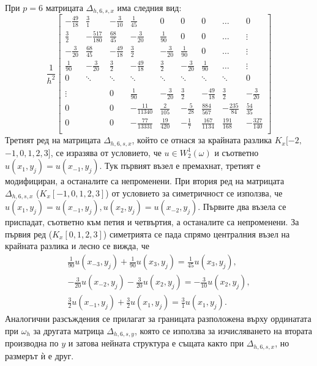 \documentclass[a4paper]{article}
\theoremstyle{remark}
\begin{document}
\begin{large}
При $p=6$ матрицата $\Delta_{h,6,s,x}$ има следния вид:
\[
\frac{1}{h^2}
\begin{bmatrix}
   -\frac{49}{18}		& \frac{3}{1}			&   -\frac{3}{10}		& \frac{1}{45}    		 &  0					& 0	   					&    0      	   	&   \dots           & 0    \\
    \frac{3}{2}    	&-\frac{517}{180}    	&    \frac{68}{45}     & -\frac{3}{20}  	 		& \frac{1}{90} 		&  0					 &   0      	   	&   \dots	       & \vdots  \\
    -\frac{3}{20}		& \frac{68}{45}         	& -\frac{49}{18} 	&  \frac{3}{2}		&  -\frac{3}{20}    	 &   \frac{1}{90}    	 &  0			&     \dots         &\vdots    \\
    \frac{1}{90}		& -\frac{3}{20}		& \frac{3}{2}         	& -\frac{49}{18} 	&  \frac{3}{2}		&  -\frac{3}{20}    	 &   \frac{1}{90} &     \dots         &\vdots    \\
        0           		& \ddots        		&         \ddots           	& \ddots        		&    \ddots   		&   \ddots      		 &     \ddots    	&  \ddots          &    0 \\	
\\
   \vdots      		&            		 	&    	0	      		& \frac{1}{90}		& -\frac{3}{20}		& \frac{3}{2}         	& -\frac{49}{18}	&  \frac{3}{2}  &  -\frac{3}{20} \\
    0      			&              	 	&    0      		&   -\frac{11}{11340}	 	&    \frac{2}{105} 	&  -\frac{5}{28} 	& \frac{884}{567} &-\frac{235}{84} &  \frac{54}{35}\\
    0              	& 	          		&    0              	&  -\frac{77}{13331}    		&  \frac{19}{420}&-\frac{1}{7}	 &  \frac{167}{1134} 	& \frac{191}{168}  &  -\frac{327}{140}\\
\end{bmatrix}
\]
Третият ред на матрицата $\Delta_{h,6,s,x}$, който се отнася за крайната разлика 
$K_x[-2,$ $-1,0,1,2,3]$, се изразява от условието, че $u \in W^1_2(\omega)$ и съответно $u(x_1, y_j) = u(x_{-1}, y_j)$. Тук първият възел е премахнат, третият е модифициран, а останалите са непроменени. При втория ред на матрицата $\Delta_{h,6,s,x}$ ($K_x[-1,0,1,2,3]$) от условието за симетричност се използва, че
$u(x_1, y_j) = u(x_{-1}, y_j), u(x_2, y_j) = u(x_{-2}, y_j).$
Първите два възела се приспадат, съответно към петия и четвъртия, а останалите са непроменени. 
За първия ред ($K_x[0,1,2,3]$) симетрията се пада спрямо централния възел на крайната разлика и лесно се вижда, че
\begin{align}
\frac{1}{90}u(x_{-3}, y_j) +\frac{1}{90}u(x_3, y_j) = \frac{1}{45}u(x_3, y_j), \nonumber\\
-\frac{3}{20}u(x_{-2}, y_j) - \frac{3}{20}u(x_2, y_j) = -\frac{3}{10}u(x_2, y_j), \nonumber\\
\frac{3}{2}u(x_{-1}, y_j) + \frac{3}{2}u(x_1, y_j) = \frac{3}{1}u(x_1, y_j). \nonumber
\end{align}
Аналогични разсъждения се прилагат за границата разположена върху ординатата при $\omega_h$ за другата матрица $\Delta_{h,6,s,y} $, която се използва за изчисляването на втората производна по $y$ и затова нейната структура е същата както при $\Delta_{h,6,s,x}$, но размерът ѝ е друг. 


\end{large}
\end{document}
